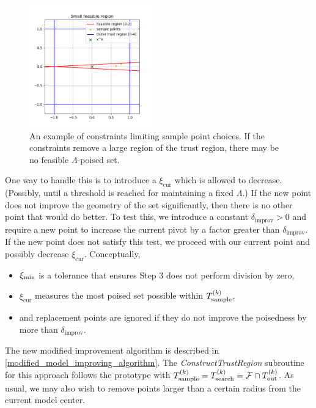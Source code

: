 \begin{figure}[ht]
    \centering
    \includegraphics[width=200px]{images/small_sample_region.png}
    \caption[An example of constraints limiting sample point choices.]
    	{An example of constraints limiting sample point choices.
    	If the constraints remove a large region of the trust region, there may be no feasible $\Lambda$-poised set.
    }
    \label{lspc}
\end{figure}


One way to handle this is to  introduce a $\xi_{\text{cur}}$ which is allowed to decrease.
(Possibly, until a threshold is reached for maintaining a fixed $\Lambda$.)
If the new point does not improve the geometry of the set significantly, then there is no other point that would do better.
To test this, we introduce a constant $\delta_{\text{improv}}>0$ and require a new point to increase the current pivot by a factor greater than $\delta_{\text{improv}}$.
If the new point does not satisfy this test, we proceed with our current point and possibly decrease $\xi_{\text{cur}}$.
Conceptually, 
\begin{itemize}
\item $\xi_{\text{min}}$ is a tolerance that ensures Step 3 does not perform division by zero,
\item $\xi_{\text{cur}}$ measures the most poised set possible within ${T_{\text{sample}}^{(k)}}$,
\item and replacement points are ignored if they do not improve the poisedness by more than $\delta_{\text{improv}}$.
\end{itemize}
The new modified improvement algorithm is described in \cref{modified_model_improving_algorithm}.
The \emph{ConstructTrustRegion} subroutine for this approach follows the prototype with ${T_{\text{sample}}^{(k)}} = {T_{\text{search}}^{(k)}} = {\mathcal F} \cap {T_{\text{out}}^{(k)}} $.
As usual, we may also wish to remove points larger than a certain radius from the current model center.

